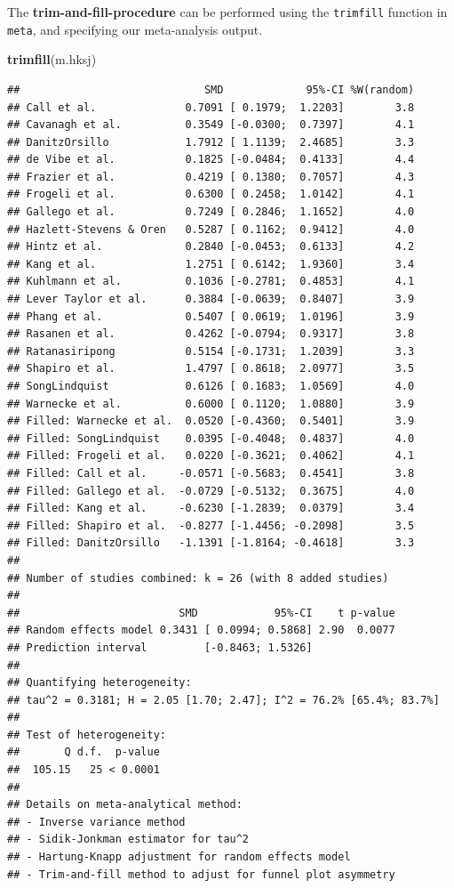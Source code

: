 \documentclass[]{book}
\newenvironment{Shaded}{\begin{snugshade}}{\end{snugshade}}
\newcommand{\KeywordTok}[1]{\textcolor[rgb]{0.13,0.29,0.53}{\textbf{#1}}}
\newcommand{\NormalTok}[1]{#1}
\begin{document}
The \textbf{trim-and-fill-procedure} can be performed using the \texttt{trimfill} function in \texttt{meta}, and specifying our meta-analysis output.

\begin{Shaded}
\begin{Highlighting}[]
\KeywordTok{trimfill}\NormalTok{(m.hksj)}
\end{Highlighting}
\end{Shaded}

\begin{verbatim}
##                             SMD             95%-CI %W(random)
## Call et al.              0.7091 [ 0.1979;  1.2203]        3.8
## Cavanagh et al.          0.3549 [-0.0300;  0.7397]        4.1
## DanitzOrsillo            1.7912 [ 1.1139;  2.4685]        3.3
## de Vibe et al.           0.1825 [-0.0484;  0.4133]        4.4
## Frazier et al.           0.4219 [ 0.1380;  0.7057]        4.3
## Frogeli et al.           0.6300 [ 0.2458;  1.0142]        4.1
## Gallego et al.           0.7249 [ 0.2846;  1.1652]        4.0
## Hazlett-Stevens & Oren   0.5287 [ 0.1162;  0.9412]        4.0
## Hintz et al.             0.2840 [-0.0453;  0.6133]        4.2
## Kang et al.              1.2751 [ 0.6142;  1.9360]        3.4
## Kuhlmann et al.          0.1036 [-0.2781;  0.4853]        4.1
## Lever Taylor et al.      0.3884 [-0.0639;  0.8407]        3.9
## Phang et al.             0.5407 [ 0.0619;  1.0196]        3.9
## Rasanen et al.           0.4262 [-0.0794;  0.9317]        3.8
## Ratanasiripong           0.5154 [-0.1731;  1.2039]        3.3
## Shapiro et al.           1.4797 [ 0.8618;  2.0977]        3.5
## SongLindquist            0.6126 [ 0.1683;  1.0569]        4.0
## Warnecke et al.          0.6000 [ 0.1120;  1.0880]        3.9
## Filled: Warnecke et al.  0.0520 [-0.4360;  0.5401]        3.9
## Filled: SongLindquist    0.0395 [-0.4048;  0.4837]        4.0
## Filled: Frogeli et al.   0.0220 [-0.3621;  0.4062]        4.1
## Filled: Call et al.     -0.0571 [-0.5683;  0.4541]        3.8
## Filled: Gallego et al.  -0.0729 [-0.5132;  0.3675]        4.0
## Filled: Kang et al.     -0.6230 [-1.2839;  0.0379]        3.4
## Filled: Shapiro et al.  -0.8277 [-1.4456; -0.2098]        3.5
## Filled: DanitzOrsillo   -1.1391 [-1.8164; -0.4618]        3.3
## 
## Number of studies combined: k = 26 (with 8 added studies)
## 
##                         SMD            95%-CI    t p-value
## Random effects model 0.3431 [ 0.0994; 0.5868] 2.90  0.0077
## Prediction interval         [-0.8463; 1.5326]             
## 
## Quantifying heterogeneity:
## tau^2 = 0.3181; H = 2.05 [1.70; 2.47]; I^2 = 76.2% [65.4%; 83.7%]
## 
## Test of heterogeneity:
##       Q d.f.  p-value
##  105.15   25 < 0.0001
## 
## Details on meta-analytical method:
## - Inverse variance method
## - Sidik-Jonkman estimator for tau^2
## - Hartung-Knapp adjustment for random effects model
## - Trim-and-fill method to adjust for funnel plot asymmetry
\end{verbatim}
\end{document}
